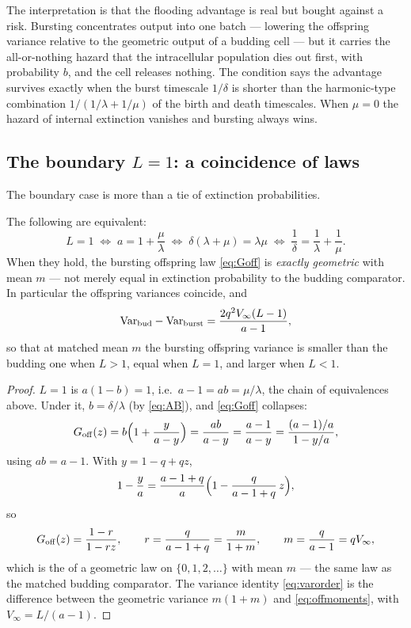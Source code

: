 The interpretation is that the flooding advantage is real but bought
against a risk. Bursting concentrates output into one batch --- lowering
the offspring variance relative to the geometric output of a budding cell
--- but it carries the all-or-nothing hazard that the intracellular
population dies out first, with probability $b$, and the cell releases
nothing. The condition says the advantage survives exactly when the burst
timescale $1/\delta$ is shorter than the harmonic-type combination
$1/(1/\lambda+1/\mu)$ of the birth and death timescales. When $\mu=0$ the
hazard of internal extinction vanishes and bursting always wins.

\subsection{The boundary $L=1$: a coincidence of laws}

The boundary case is more than a tie of extinction probabilities.

\begin{proposition}
\label{prop:L1}
The following are equivalent:
\begin{equation}
L=1
\;\Longleftrightarrow\;
a=1+\frac{\mu}{\lambda}
\;\Longleftrightarrow\;
\delta(\lambda+\mu)=\lambda\mu
\;\Longleftrightarrow\;
\frac{1}{\delta}=\frac{1}{\lambda}+\frac{1}{\mu}.
\end{equation}
When they hold, the bursting offspring law \eqref{eq:Goff} is
\emph{exactly geometric} with mean $m$ --- not merely equal in extinction
probability to the budding comparator. In particular the offspring
variances coincide, and
\begin{equation}
\mathrm{Var}_{\rm bud}-\mathrm{Var}_{\rm burst}
=\frac{2q^2V_\infty(L-1)}{a-1},
\label{eq:varorder}
\end{equation}
so that at matched mean $m$ the bursting offspring variance is smaller
than the budding one when $L>1$, equal when $L=1$, and larger when $L<1$.
\end{proposition}

\begin{proof}
$L=1$ is $a(1-b)=1$, i.e.\ $a-1=ab=\mu/\lambda$, the chain of equivalences
above. Under it, $b=\delta/\lambda$ (by \eqref{eq:AB}), and \eqref{eq:Goff}
collapses:
$$
G_{\rm off}(z)=b\Bigl(1+\frac{y}{a-y}\Bigr)=\frac{ab}{a-y}
=\frac{a-1}{a-y}
=\frac{(a-1)/a}{1-y/a},
$$
using $ab=a-1$. With $y=1-q+qz$,
$$
1-\frac{y}{a}=\frac{a-1+q}{a}\Bigl(1-\frac{q}{a-1+q}\,z\Bigr),
$$
so
$$
G_{\rm off}(z)=\frac{1-r}{1-rz},
\qquad
r=\frac{q}{a-1+q}=\frac{m}{1+m},
\qquad m=\frac{q}{a-1}=qV_\infty,
$$
which is the \pgf{} of a geometric law on $\{0,1,2,\ldots\}$ with mean $m$
--- the same law as the matched budding comparator. The variance identity
\eqref{eq:varorder} is the difference between the geometric variance
$m(1+m)$ and \eqref{eq:offmoments}, with $V_\infty=L/(a-1)$.
\end{proof}

